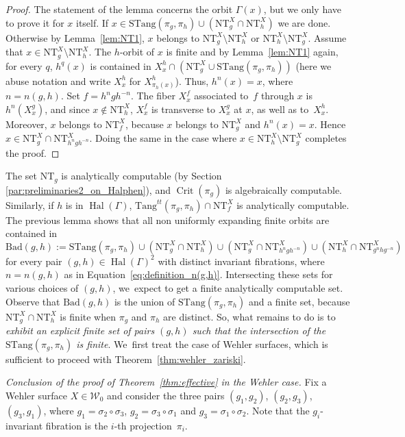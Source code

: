 \documentclass[JEP,XML,SOM,Unicode,published]{cedram}
\DeclareMathOperator{\Crit}{Crit}
\DeclareMathOperator{\Hal}{Hal}
\newcommand{\cW}{\mathcal{W}}
\newcommand{\Tang}{{\mathrm{Tang}}}
\newcommand{\STang}{{\mathrm{STang}}}
\newcommand{\NT}{{\mathrm{NT}}}
\theoremstyle{plain}
\theoremstyle{definition}
\begin{document}
\begin{proof}
The statement of the lemma concerns the orbit $\Gamma(x)$, but we only have to prove it for $x$ itself.
If $x\in \STang(\pi_g, \pi_h) \cup (\NT_g^X \cap \NT_h^X)$ we are done.
Otherwise by Lemma~\ref{lem:NT1}, $x$ belongs to
$\NT_g^X\setminus \NT_h^X$ or $\NT_h^X\setminus \NT_g^X$.
Assume that $x\in \NT_g^X\setminus \NT_h^X$.
The $h$-orbit of $x$ is finite and by Lemma~\ref{lem:NT1} again,
for every $q$, $h^q(x)$ is contained in
$X^h_{x}\cap (\NT_g^X \cup \STang(\pi_g, \pi_h))$ (here we abuse notation and
write $X^h_{x}$ for $X^h_{\pi_h(x)}$). Thus,
$h^{n}(x) = x$, where $n=n(g,h)$. Set $f = h^{n} g h^{-n}$. The fiber $X^f_x$ associated to~$f$ through $x$
is $h^{n}( X^g_x)$, and since $x\notin \NT_h^X$, $X^f_x$ is transverse to
$X^g_x$ at $x$, as well as to~$X^h_x$. Moreover, $x$ belongs to $\NT_f^X$, because $x$ belongs to $\NT_g^X$ and $h^n(x)=x$. Hence $x\in \NT_g^X\cap \NT_{h^ngh^{-n}}^X$. Doing the same
in the case where $x\in \NT_h^X\setminus \NT_g^X$ completes the proof.
\end{proof}

The set $\NT_g$ is analytically computable (by Section \ref{par:preliminaries2_on_Halphen}), and $\Crit(\pi_g)$ is algebraically computable. Similarly, if $h$ is in $\Hal(\Gamma)$, $\Tang^{tt}(\pi_g,\pi_h)\cap \NT_f^X$ is analytically computable.
The previous lemma
shows that all non uniformly expanding finite orbits are contained in
\[
\mathrm{Bad}(g,h):=\STang(\pi_g, \pi_h) \cup
(\NT_g^X\cap \NT_h^X)\cup (\NT_g^X\cap \NT_{h^n gh^{-n}}^X) \cup (\NT_h^X\cap \NT_{g^nhg^{-n}}^X)
\]
for every pair $(g,h)\in \Hal(\Gamma)^2$ with distinct invariant fibrations, where $n = n(g,h)$ as in Equation~\eqref{eq:definition_n(g,h)}.
Intersecting these sets for various choices of $(g,h)$, we~expect to get a finite analytically computable set.
Observe that $\mathrm{Bad}(g,h)$
is the union of $\STang(\pi_g, \pi_h)$ and a finite set, because $\NT_g^X\cap \NT_h^X$ is finite when $\pi_g$ and $\pi_h$ are distinct. So, what remains to do is to
\textit{exhibit an explicit finite set of pairs $(g,h)$ such that the
intersection of the $\STang(\pi_g, \pi_h)$ is finite}. We~first treat the case of Wehler surfaces,
which is sufficient to proceed with Theorem~\ref{thm:wehler_zariski}.

\smallskip

\noindent \textit{Conclusion of the proof of Theorem~\ref{thm:effective} in the Wehler case.}
Fix a Wehler surface $X\in {\cW}_0$ and consider the three pairs $(g_1, g_2)$, $(g_2,g_3)$, $(g_3,g_1)$, where $g_1 = \sigma_2\circ \sigma_3$, $g_2 = \sigma_3\circ\sigma_1$ and $g_3 =\sigma_1\circ\sigma_2$. Note that the $g_i$-invariant fibration is the $i$-th projection~$\pi_i$.
\end{document}
